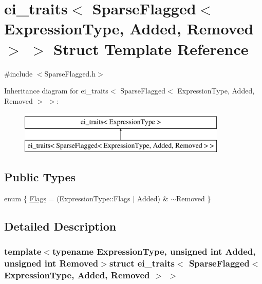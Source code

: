 \hypertarget{structei__traits_3_01_sparse_flagged_3_01_expression_type_00_01_added_00_01_removed_01_4_01_4}{\section{ei\-\_\-traits$<$ Sparse\-Flagged$<$ Expression\-Type, Added, Removed $>$ $>$ Struct Template Reference}
\label{structei__traits_3_01_sparse_flagged_3_01_expression_type_00_01_added_00_01_removed_01_4_01_4}
}


{\ttfamily \#include $<$Sparse\-Flagged.\-h$>$}

Inheritance diagram for ei\-\_\-traits$<$ Sparse\-Flagged$<$ Expression\-Type, Added, Removed $>$ $>$\-:\begin{figure}[H]
\begin{center}
\leavevmode
\includegraphics[height=2.000000cm]{structei__traits_3_01_sparse_flagged_3_01_expression_type_00_01_added_00_01_removed_01_4_01_4}
\end{center}
\end{figure}
\subsection*{Public Types}
\begin{DoxyCompactItemize}
\item 
enum \{ \hyperlink{structei__traits_3_01_sparse_flagged_3_01_expression_type_00_01_added_00_01_removed_01_4_01_4_a68364af44b26aff88f5b0f8c78c7d136ac26ff3a1e9892fc8346435919395f19c}{Flags} = (Expression\-Type\-:\-:Flags $|$ Added) \& $\sim$\-Removed
 \}
\end{DoxyCompactItemize}


\subsection{Detailed Description}
\subsubsection*{template$<$typename Expression\-Type, unsigned int Added, unsigned int Removed$>$struct ei\-\_\-traits$<$ Sparse\-Flagged$<$ Expression\-Type, Added, Removed $>$ $>$}



